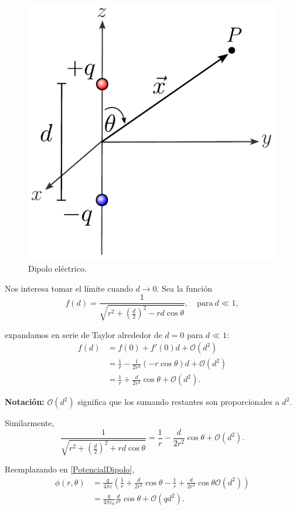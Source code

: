 \begin{figure}[H]
    \centering
    \includegraphics[scale = 0.7]{Figuras/DipoloElectrico.pdf}
    \caption{Dipolo eléctrico.}
    \label{fig:dipolo}
\end{figure}

Nos interesa tomar el límite cuando $d \to 0$. Sea la función 
$$f(d) = \frac{1}{\sqrt{r^2 + \left(\frac{d}{2} \right)^2 - rd \cos\theta}}, \quad \text{para} ~ d \ll 1,$$

expandamos en serie de Taylor alrededor de $d = 0$ para $d \ll 1$:
\begin{align*}
    f(d) &= f(0) + f'(0) d + \mathcal{O}(d^2) \\
    &= \frac{1}{r} - \frac{1}{2r^3} (-r \cos\theta) d + \mathcal{O}(d^2) \\
    &= \frac{1}{r} + \frac{d}{2r^2} \cos \theta + \mathcal{O}(d^2) .
\end{align*}

\textbf{Notación:} $\mathcal{O}(d^2)$ significa que los sumando restantes son proporcionales a $d^2$.

Similarmente,
$$\frac{1}{\sqrt{r^2 + \left(\frac{d}{2} \right)^2 + rd \cos\theta}} = \frac{1}{r} - \frac{d}{2r^2} \cos\theta + \mathcal{O}(d^2).$$

Reemplazando en \eqref{PotencialDipolo},
\begin{align*}
   \phi(r, \theta) &= \frac{q}{4\pi\varepsilon}  \left( \frac{1}{r} + \frac{d}{2r^2} \cos \theta - \frac{1}{r} +  \frac{d}{2r^2} \cos \theta \mathcal{O}(d^2) \right) \\
   &= \frac{q}{4\pi \varepsilon_0} \frac{d}{r^2} \cos \theta + \mathcal{O}(qd^2).
\end{align*}


